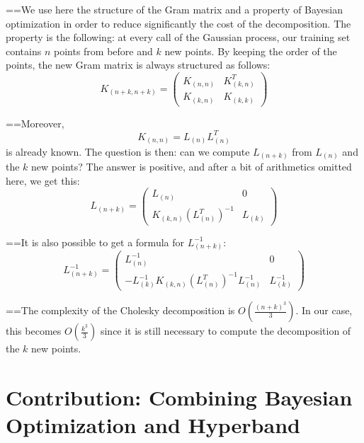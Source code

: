 ==We use here the structure of the Gram matrix and a property of Bayesian optimization in order to reduce significantly the cost of the decomposition. The property is the following: at every call of the Gaussian process, our training set contains $n$ points from before and $k$ new points. By keeping the order of the points, the new Gram matrix is always structured as follows:
\begin{equation}
	K_{(n+k,n+k)} = 
    \begin{pmatrix}
    K_{(n,n)} & K_{(k,n)}^T \\
    K_{(k,n)} & K_{(k,k)}
  \end{pmatrix}
\end{equation}

==Moreover,
\begin{equation}
	 K_{(n,n)} = L_{(n)} L_{(n)}^T
\end{equation}
is already known. The question is then: can we compute $L_{(n+k)}$ from $L_{(n)}$ and the $k$ new points? The answer is positive, and after a bit of arithmetics omitted here, we get this:
\begin{equation}
  L_{(n+k)} = 
  \begin{pmatrix}
    L_{(n)} & 0 \\
    K_{(k,n)} (L_{(n)}^T)^{-1} & L_{(k)}
  \end{pmatrix}
\end{equation}

==It is also possible to get a formula for $ L_{(n+k)}^{-1}$:
\begin{equation}
  L_{(n+k)}^{-1} =
  \begin{pmatrix}
    L_{(n)}^{-1} & 0 \\
    - L_{(k)}^{-1} K_{(k,n)} (L_{(n)}^T)^{-1} L_{(n)}^{-1} & L_{(k)}^{-1}
  \end{pmatrix}
\end{equation}

==The complexity of the Cholesky decomposition is $O\left(\frac{(n+k)^3}{3}\right)$. In our case, this becomes $O\left(\frac{k^3}{3}\right)$ since it is still necessary to compute the decomposition of the $k$ new points.

\section{Contribution: Combining Bayesian Optimization and Hyperband}
\label{sec:cap}

